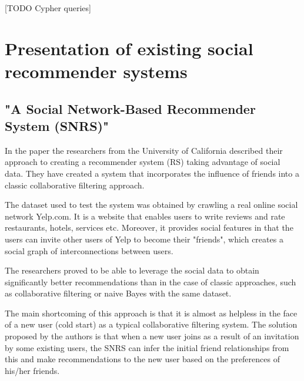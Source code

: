 \documentclass[12pt]{report}
\begin{document}
\hbox{}
[TODO Cypher queries]




\chapter[Presentation of existing social recommender...]{Presentation of existing social recommender systems}

\section{"A Social Network-Based Recommender System (SNRS)"}

In the paper \cite{snrs} the researchers from the University of California described their approach to creating a recommender system (RS) taking advantage of social data. They have created a system that incorporates the influence of friends into a classic collaborative filtering approach. 

The dataset used to test the system was obtained by crawling a real online social network Yelp.com. It is a website that enables users to write reviews and rate restaurants, hotels, services etc. Moreover, it provides social features in that the users can invite other users of Yelp to become their "friends", which creates a social graph of interconnections between users.

The researchers proved to be able to leverage the social data to obtain significantly better recommendations than in the case of classic approaches, such as collaborative filtering or naive Bayes with the same dataset. 

\hbox{}
The main shortcoming of this approach is that it is almost as helpless in the face of a new user (cold start) as a typical collaborative filtering system. The solution proposed by the authors is that when a new user joins as a result of an invitation by some existing users, the SNRS can infer the initial friend relationships from this and make recommendations to the new user based on the preferences of his/her friends. 
\end{document}
